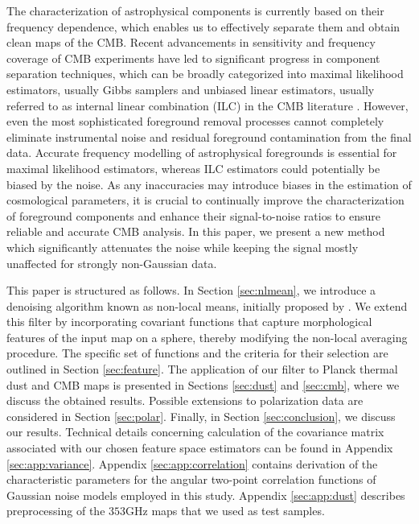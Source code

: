 \documentclass{aa}
\begin{document}
The characterization of astrophysical components is currently based on their frequency dependence, which enables us to effectively separate them and obtain clean maps of the CMB. Recent advancements in sensitivity and frequency coverage of CMB experiments have led to significant progress in component separation techniques, which can be broadly categorized into maximal likelihood estimators, usually Gibbs samplers \citep{2004PhRvD..70h3511W, 2008ApJ...676...10E} and unbiased linear estimators, usually referred to as internal linear combination (ILC) in the CMB literature \citep{2003MNRAS.345.1101M, 2003MNRAS.346.1089D, 2008arXiv0803.1814C, 2011MNRAS.418..467R}. However, even the most sophisticated foreground removal processes cannot completely eliminate instrumental noise and residual foreground contamination from the final data. Accurate frequency modelling of astrophysical foregrounds is essential for maximal likelihood estimators, whereas ILC estimators could potentially be biased by the noise. As any inaccuracies may introduce biases in the estimation of cosmological parameters, it is crucial to continually improve the characterization of foreground components and enhance their signal-to-noise ratios to ensure reliable and accurate CMB analysis. In this paper, we present a new method which significantly attenuates the noise while keeping the signal mostly unaffected for strongly non-Gaussian data.

This paper is structured as follows. In Section \ref{sec:nlmean}, we introduce a denoising algorithm known as non-local means, initially proposed by \citet{Buades:2005}. We extend this filter by incorporating covariant functions that capture morphological features of the input map on a sphere, thereby modifying the non-local averaging procedure. The specific set of functions and the criteria for their selection are outlined in Section \ref{sec:feature}. The application of our filter to Planck thermal dust and CMB maps is presented in Sections \ref{sec:dust} and \ref{sec:cmb}, where we discuss the obtained results. Possible extensions to polarization data are considered in Section \ref{sec:polar}. Finally, in Section \ref{sec:conclusion}, we discuss our results. Technical details concerning calculation of the covariance matrix associated with our chosen feature space estimators can be found in Appendix \ref{sec:app:variance}. Appendix \ref{sec:app:correlation} contains derivation of the characteristic parameters for the angular two-point correlation functions of Gaussian noise models employed in this study. Appendix \ref{sec:app:dust} describes preprocessing of the $353$GHz maps that we used as test samples.
\end{document}
